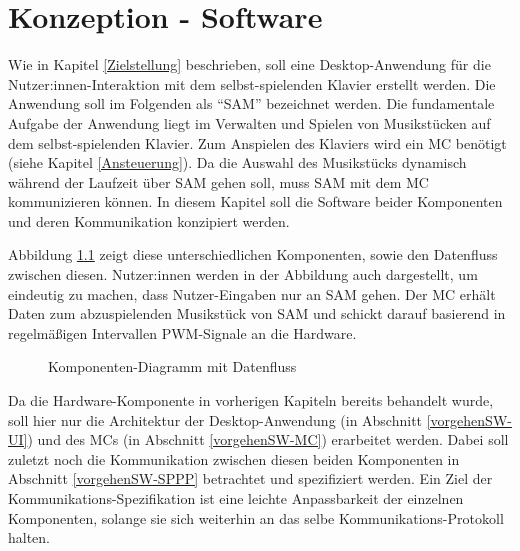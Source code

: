 
\chapter{Konzeption - Software} \label{vorgehenSW}

Wie in Kapitel \ref{Zielstellung} beschrieben, soll eine Desktop-Anwendung für die Nutzer:innen-Interaktion mit dem selbst-spielenden Klavier erstellt werden.
Die Anwendung soll im Folgenden als \enquote{\ac{SAM}} bezeichnet werden.
Die fundamentale Aufgabe der Anwendung liegt im Verwalten und Spielen von Musikstücken auf dem selbst-spielenden Klavier.
Zum Anspielen des Klaviers wird ein \ac{MC} benötigt (siehe Kapitel \ref{Ansteuerung}).
Da die Auswahl des Musikstücks dynamisch während der Laufzeit über \ac{SAM} gehen soll, muss \ac{SAM} mit dem \ac{MC} kommunizieren können.
In diesem Kapitel soll die Software beider Komponenten und deren Kommunikation konzipiert werden.

Abbildung \ref*{fig:high-level-komponenten} zeigt diese unterschiedlichen Komponenten, sowie den Datenfluss zwischen diesen.
Nutzer:innen werden in der Abbildung auch dargestellt, um eindeutig zu machen, dass Nutzer-Eingaben nur an \ac{SAM} gehen.
Der \ac{MC} erhält Daten zum abzuspielenden Musikstück von \ac{SAM} und schickt darauf basierend in regelmäßigen Intervallen \ac{PWM}-Signale an die Hardware.

\begin{figure}[htbp]
    \centering
    \caption{Komponenten-Diagramm mit Datenfluss}
    \label{fig:high-level-komponenten}
\end{figure}

Da die Hardware-Komponente in vorherigen Kapiteln bereits behandelt wurde, soll hier nur die Architektur der Desktop-Anwendung (in Abschnitt \ref{vorgehenSW-UI}) und des \ac{MC}s (in Abschnitt \ref{vorgehenSW-MC}) erarbeitet werden.
Dabei soll zuletzt noch die Kommunikation zwischen diesen beiden Komponenten in Abschnitt \ref{vorgehenSW-SPPP} betrachtet und spezifiziert werden.
Ein Ziel der Kommunikations-Spezifikation ist eine leichte Anpassbarkeit der einzelnen Komponenten, solange sie sich weiterhin an das selbe Kommunikations-Protokoll halten.

